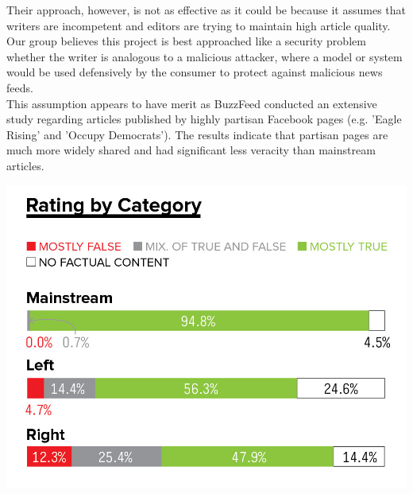 \documentclass[11pt]{article}
\begin{document}
\indent Their approach, however, is not as effective as it could be because it assumes that writers are incompetent and editors are trying to maintain high article quality.  Our group believes this project is best approached like a security problem whether the writer is analogous to a malicious attacker, where a model or system would be used defensively by the consumer to protect against malicious news feeds. \\
\indent This assumption appears to have merit as BuzzFeed conducted an extensive study regarding articles published by highly partisan Facebook pages (e.g. 'Eagle Rising' and 'Occupy Democrats').  The results indicate that partisan pages are much more widely shared and had significant less veracity than mainstream articles.

\begin{center}
	\includegraphics[scale=0.2]{BuzzFeedRatings.jpg}
\end{center}
\end{document}
